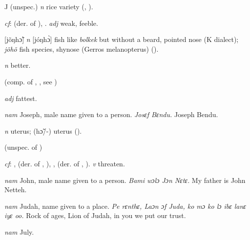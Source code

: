 \begin{letter}{J}
 (unspec.) \textit{n} rice variety (\citealt{Pichl1967}, \citealt{Sumner1921}).

 \textit{cf}:  (der. of ), . \textit{adj} weak, feeble.

 [jõŋhɔ̃] \textit{n} [jóŋhɔ̀] fish like \textit{bolkek} but without a beard, pointed nose (K dialect); \textit{jõhõ} fish species, shynose (Gerros melanopterus) (\citealt{Pichl1967}).

 \textit{n} better.

 (comp. of , , see ) 

 \textit{adj} fattest.

 \textit{nam} Joseph, male name given to a person. \textit{Josɛf Bɛndu.} Joseph Bendu.

 \textit{n} uterus; (hɔ̃/-) uterus (\citealt{Pichl1967}). 

 (unspec. of ) 

 \textit{cf}: ,  (der. of , ), ,  (der. of , ). \textit{v} threaten.

 \textit{nam} John, male name given to a person. \textit{Bami wɔlɔ Jɔn Nɛtɛ.} My father is John Netteh.

 \textit{nam} Judah, name given to a place. \textit{Pe rɛnthɛ, Laɔn ɔf Juda, ko mɔ ko lɔ ibɛ lanɛ iyɛ oo.} Rock of ages, Lion of Judah, in you we put our trust.

 \textit{nam} July.

\end{letter}
